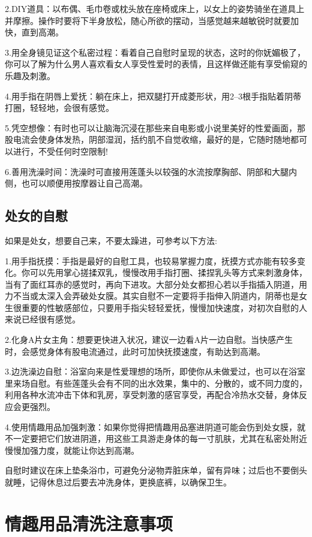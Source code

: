 \documentclass[12pt,UTF8]{ctexbook}
\begin{document}
2.DIY道具：以布偶、毛巾卷或枕头放在座椅或床上，以女上的姿势骑坐在道具上并摩擦。操作时要将下半身放松，随心所欲的摆动，当感觉越来越敏锐时就要加快，直到高潮。

3.用全身镜见证这个私密过程：看着自己自慰时呈现的状态，这时的你妩媚极了，你可以了解为什么男人喜欢看女人享受性爱时的表情，且这样做还能有享受偷窥的乐趣及刺激。

4.用手指在阴唇上爱抚：躺在床上，把双腿打开成菱形状，用2--3根手指贴着阴蒂打圈，轻轻地，会很有感觉。

5.凭空想像：有时也可以让脑海沉浸在那些来自电影或小说里美好的性爱画面，那股电流会使身体发热，阴部湿润，括约肌不自觉收缩，最好的是，它随时随地都可以进行，不受任何时空限制!

6.善用洗澡时间：洗澡时可直接用莲蓬头以较强的水流按摩胸部、阴部和大腿内侧，也可以顺便用按摩器让自己高潮。

\subsection{处女的自慰}

如果是处女，想要自己来，不要太躁进，可参考以下方法:

1.用手指抚摸：手指是最好的自慰工具，也较易掌握力度，抚摸方式亦能有较多变化。你可以先用掌心搓揉双乳，慢慢改用手指打圈、揉捏乳头等方式来刺激身体，当有了面红耳赤的感觉时，再向下进攻。大部分处女都担心若以手指插入阴道，用力不当或太深入会弄破处女膜。其实自慰不一定要将手指伸入阴道内，阴蒂也是女生很重要的性敏感部位，只要用手指尖轻轻爱抚，慢慢加快速度，对初次自慰的人来说已经很有感觉。

2.化身A片女主角：想要更快进入状况，建议一边看A片一边自慰。当快感产生时，会感觉身体有股电流通过，此时可加快抚摸速度，有助达到高潮。

3.边洗澡边自慰：浴室向来是性爱理想的场所，即使你从未做爱过，也可以在浴室里来场自慰。有些莲蓬头会有不同的出水效果，集中的、分散的，或不同力度的，利用各种水流冲击下体和乳房，享受刺激的感官享受，再配合冷热水交替，身体反应会更强烈。

4.使用情趣用品加强刺激：如果你觉得把情趣用品塞进阴道可能会伤到处女膜，就不一定要把它们放进阴道，用这些工具游走身体的每一寸肌肤，尤其在私密处附近慢慢加强力度，就能让你达到高潮。

自慰时建议在床上垫条浴巾，可避免分泌物弄脏床单，留有异味；过后也不要倒头就睡，记得休息过后要去冲洗身体，更换底裤，以确保卫生。

\section{情趣用品清洗注意事项}
\end{document}
